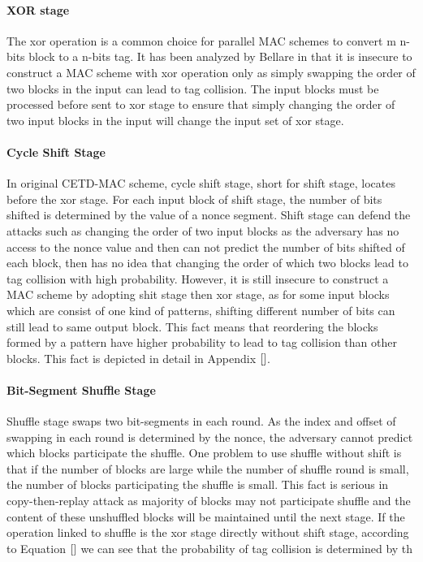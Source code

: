 \paragraph{XOR stage}
The xor operation is a common choice for parallel MAC schemes to convert m n-bits block to a n-bits tag. It has been analyzed by Bellare in \cite{} that it is insecure to construct a MAC scheme with xor operation only as simply swapping the order of two blocks in the input can lead to tag collision.  The input blocks must be processed before sent to xor stage to ensure that simply changing the order of two input blocks in the input will change the input set of xor stage.
\paragraph{Cycle Shift Stage}
In original CETD-MAC scheme, cycle shift stage, short for shift stage, locates before the xor stage. For each input block of shift stage, the number of bits shifted is determined by the value of a nonce segment. Shift stage can defend the attacks such as changing the order of two input blocks as the adversary has no access to the nonce value and then can not predict the number of bits shifted of each block, then has no idea that changing the order of which two blocks lead to tag collision with high probability. However, it is still insecure to construct a MAC scheme by adopting shit stage then xor stage, as for some input blocks which are consist of one kind of patterns, shifting different number of bits can still lead to same output block. This fact means that reordering the blocks formed by a pattern have higher probability to lead to tag collision than other blocks. This fact is depicted in detail in Appendix $\ref{}$. 

\paragraph{Bit-Segment Shuffle Stage}
Shuffle stage swaps two bit-segments in each round. As the index and offset of swapping in each round is determined by the nonce, the adversary cannot predict which blocks participate the shuffle. One problem to use shuffle without shift is that if the number of blocks are large while the number of shuffle round is small, the number of blocks participating the shuffle is small. This fact is serious in copy-then-replay attack as majority of blocks may not participate shuffle and the content of these unshuffled blocks will be maintained until the next stage. If the operation linked to shuffle is the xor stage directly without shift stage, according to Equation $\ref{}$ we can see that the probability of tag collision is determined by th

